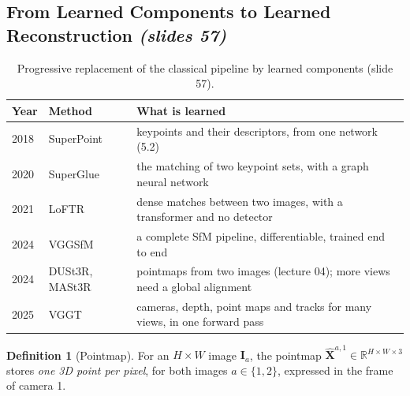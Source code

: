 \documentclass[11pt,a4paper]{article}
\newcommand{\slr}[1]{\texorpdfstring{\emph{(slides #1)}}{(slides #1)}}
\newcommand{\R}{\mathbb{R}}
\theoremstyle{definition}
\newtheorem{definition}{Definition}[section]
\theoremstyle{plain}
\theoremstyle{remark}
\begin{document}
\subsection{From Learned Components to Learned Reconstruction \slr{57}}
\begin{table}[H]
\centering
\begin{tabular}{@{}llp{9.3cm}@{}}
\toprule
Year & Method & What is learned\\
\midrule
2018 & SuperPoint & keypoints and their descriptors, from one network (5.2)\\
2020 & SuperGlue & the matching of two keypoint sets, with a graph neural network\\
2021 & LoFTR & dense matches between two images, with a transformer and no detector\\
2024 & VGGSfM & a complete SfM pipeline, differentiable, trained end to end\\
2024 & DUSt3R, MASt3R & pointmaps from two images (lecture 04); more views need a global alignment\\
2025 & VGGT & cameras, depth, point maps and tracks for many views, in one forward pass\\
\bottomrule
\end{tabular}
\caption{Progressive replacement of the classical pipeline by learned components (slide 57).}
\end{table}

\begin{definition}[Pointmap]\label{def:pointmap}
For an $H\times W$ image $\bm I_a$, the pointmap $\hat{\bm X}^{a,1}\in\R^{H\times W\times3}$ stores \emph{one 3D point per pixel}, for both images $a\in\{1,2\}$, expressed in the frame of camera 1.
\end{definition}
\end{document}
